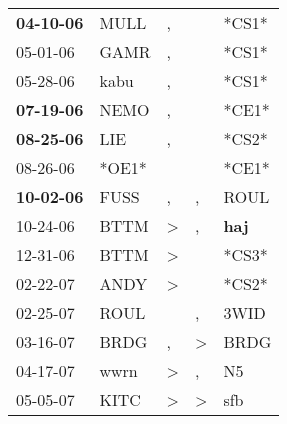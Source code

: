 \begin{supertabular}{p{0.07\textwidth}p{0.06\textwidth}p{0.02\textwidth}p{0.02\textwidth}p{0.06\textwidth}}
 \textbf{04-10-06\textsuperscript{}} &           MULL\textsuperscript{} &                , &                  &                            *CS1* \\
          05-01-06\textsuperscript{} &           GAMR\textsuperscript{} &                , &                  &                            *CS1* \\
          05-28-06\textsuperscript{} &           kabu\textsuperscript{} &                , &                  &                            *CS1* \\
 \textbf{07-19-06\textsuperscript{}} &           NEMO\textsuperscript{} &                , &                  &                            *CE1* \\
 \textbf{08-25-06\textsuperscript{}} &            LIE\textsuperscript{} &                , &                  &                            *CS2* \\
          08-26-06\textsuperscript{} &                            *OE1* &                  &                  &                            *CE1* \\
 \textbf{10-02-06\textsuperscript{}} &           FUSS\textsuperscript{} &                , &                , &           ROUL\textsuperscript{} \\
          10-24-06\textsuperscript{} &           BTTM\textsuperscript{} &     \textgreater &                , &   \textbf{haj\textsuperscript{}} \\
          12-31-06\textsuperscript{} &           BTTM\textsuperscript{} &     \textgreater &                  &                            *CS3* \\
          02-22-07\textsuperscript{} &           ANDY\textsuperscript{} &     \textgreater &                  &                            *CS2* \\
          02-25-07\textsuperscript{} &           ROUL\textsuperscript{} &                  &                , &           3WID\textsuperscript{} \\
          03-16-07\textsuperscript{} &           BRDG\textsuperscript{} &                , &     \textgreater &           BRDG\textsuperscript{} \\
          04-17-07\textsuperscript{} &           wwrn\textsuperscript{} &     \textgreater &                , &             N5\textsuperscript{} \\
          05-05-07\textsuperscript{} &           KITC\textsuperscript{} &     \textgreater &     \textgreater &            sfb\textsuperscript{} \\

\end{supertabular}
